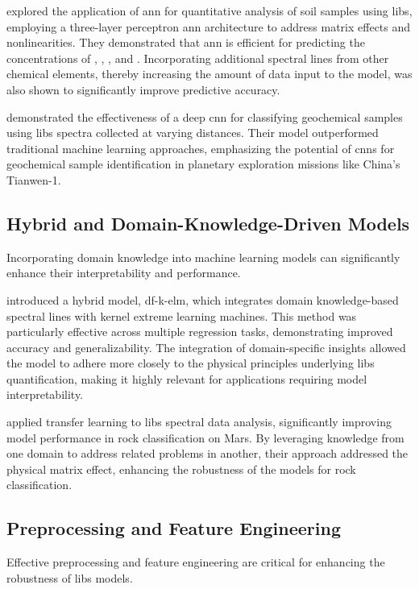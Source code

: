 \citet{el_haddad_ann_2013} explored the application of \gls{ann} for quantitative analysis of soil samples using \gls{libs}, employing a three-layer perceptron \gls{ann} architecture to address matrix effects and nonlinearities.
They demonstrated that \gls{ann} is efficient for predicting the concentrations of , , , and .
Incorporating additional spectral lines from other chemical elements, thereby increasing the amount of data input to the model, was also shown to significantly improve predictive accuracy.

\citet{yangConvolutionalNeuralNetwork2022} demonstrated the effectiveness of a deep \gls{cnn} for classifying geochemical samples using \gls{libs} spectra collected at varying distances.
Their model outperformed traditional machine learning approaches, emphasizing the potential of \gls{cnn}s for geochemical sample identification in planetary exploration missions like China's Tianwen-1.

\subsection{Hybrid and Domain-Knowledge-Driven Models}
Incorporating domain knowledge into machine learning models can significantly enhance their interpretability and performance.

\citet{song_DF-K-ELM} introduced a hybrid model, \gls{df}-\gls{k-elm}, which integrates domain knowledge-based spectral lines with kernel extreme learning machines.
This method was particularly effective across multiple regression tasks, demonstrating improved accuracy and generalizability.
The integration of domain-specific insights allowed the model to adhere more closely to the physical principles underlying \gls{libs} quantification, making it highly relevant for applications requiring model interpretability.

\citet{sunMachineLearningTransfer2021} applied transfer learning to \gls{libs} spectral data analysis, significantly improving model performance in rock classification on Mars.
By leveraging knowledge from one domain to address related problems in another, their approach addressed the physical matrix effect, enhancing the robustness of the models for rock classification.

\subsection{Preprocessing and Feature Engineering}
Effective preprocessing and feature engineering are critical for enhancing the robustness of \gls{libs} models.

